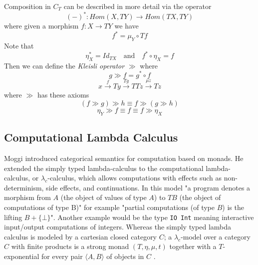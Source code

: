 \documentclass[a4paper,10pt]{article}
\theoremstyle{definition}
\begin{document}
Composition in $C_T$ can be described in more detail via the operator
\begin{equation}
    (-)^{*} : Hom(X, TY) \rightarrow Hom(TX, TY)
\end{equation}
where given a morphism $f: X \rightarrow TY$ we have
\begin{equation}
    f^{*} = \mu_{Y} \circ Tf
\end{equation}
Note that
\begin{equation}
    \eta_{X}^{*} = Id_{TX}
    \quad\textrm{and}\quad
    f^{*} \circ \eta _{X} = f
\end{equation}
Then we can define the \textit{Kleisli operator} $\gg$ where
\begin{equation}
    g \gg f = g^{*} \circ f
\end{equation}
\begin{equation}
    x
    \stackrel{f}{\rightarrow}     T y
    \stackrel{T g}{\rightarrow}   T T z
    \stackrel{\mu z}{\rightarrow} T z
\end{equation}
where $\gg$ has these axioms
\begin{equation}
    (f \gg g) \gg h \equiv f \gg (g \gg h)
\end{equation}
\begin{equation}
    \eta_Y \gg f \equiv f \equiv f \gg \eta_X
\end{equation}

\subsection{Computational Lambda Calculus}
Moggi \cite{moggi1989computational}
introduced categorical semantics for computation based on monads.
He extended the simply typed lambda-calculus to
the computational lambda-calculus, or $\lambda_c$-calculus,
which allows computations with effects such as
non-determinism, side effects, and continuations.
In this model "a program denotes a morphism from $A$
(the object of values of type $A$) to $TB$
(the object of computations of type B)"
for example
"partial computations (of type $B$) is the lifting $B + \{\bot\}$".
Another example would be the type \texttt{IO Int}
meaning interactive input/output computations of integers.
Whereas the simply typed lambda calculus is modeled by a cartesian closed category $C$;
a $\lambda_c$-model over a category $C$ with finite products is a strong monad $(T,\eta,\mu,t)$
together with a $T$-exponential for every pair $\langle A, B\rangle$ of objects in $C$
\cite{moggi1989computational}.
\end{document}
